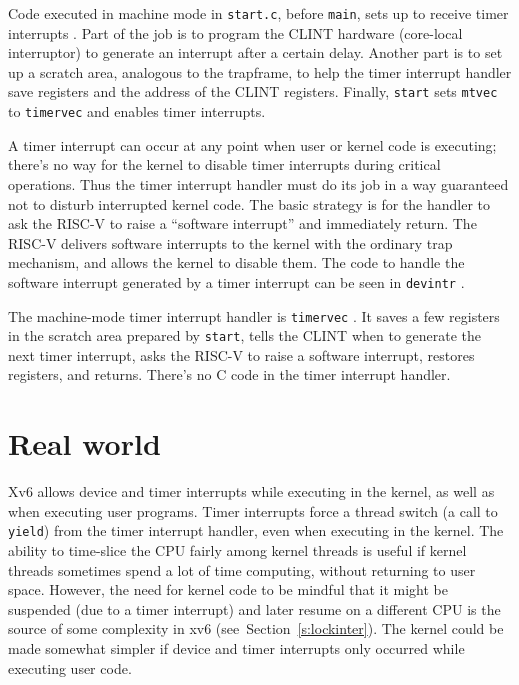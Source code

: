 Code executed in machine mode in {\tt start.c}, before {\tt main},
sets up to receive timer interrupts
.
Part of the job is to program the CLINT hardware (core-local interruptor)
to generate an interrupt after a certain delay.
Another part is to set up a scratch area, analogous to the trapframe,
to help
the timer interrupt handler save registers and 
the address of the CLINT registers.
Finally, {\tt start} sets {\tt mtvec} to {\tt timervec} and
enables timer interrupts.

A timer interrupt can occur at any point when user or kernel code is
executing; there's no way for the kernel to disable timer interrupts
during critical operations. Thus the timer interrupt handler must do
its job in a way guaranteed not to disturb interrupted kernel code.
The basic strategy is for the handler to ask the RISC-V to
raise a ``software interrupt'' and immediately return. The RISC-V
delivers software interrupts to the kernel with the ordinary trap
mechanism, and allows the kernel to disable them. The code to
handle the software interrupt generated by a timer interrupt can be
seen in {\tt devintr} .

The machine-mode timer interrupt handler is {\tt timervec} 
.
It saves a few registers in the scratch area prepared by {\tt start},
tells the CLINT when to generate the next timer interrupt,
asks the RISC-V to raise a software interrupt,
restores registers, and returns.
There's no C code in the timer interrupt handler.

\section{Real world}

Xv6 allows device and timer interrupts while executing in the kernel,
as well as when executing user programs. Timer interrupts force a
thread switch (a call to {\tt yield}) from the timer interrupt
handler, even when executing in the kernel. The ability to time-slice
the CPU fairly among kernel threads is useful if kernel threads
sometimes spend a lot of time computing, without returning to user
space. However, the need for kernel code to be mindful that it might
be suspended (due to a timer interrupt) and later resume on a
different CPU is the source of some complexity in xv6
(see~Section~\ref{s:lockinter}). The kernel could be made somewhat
simpler if device and timer interrupts only occurred while executing
user code.


